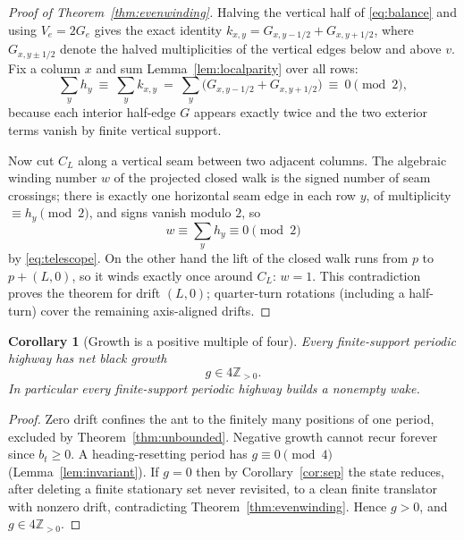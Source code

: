 \documentclass[11pt,letterpaper]{article}
\theoremstyle{plain}
\newtheorem{corollary}[theorem]{Corollary}
\theoremstyle{definition}
\newcommand{\Z}{\mathbb{Z}}
\newcommand{\growth}{g}
\begin{document}
\begin{NoHyper}
\begin{proof}[Proof of Theorem~\ref{thm:evenwinding}]
Halving the vertical half of \eqref{eq:balance} and using $V_e=2G_e$ gives the exact
identity $k_{x,y}=G_{x,y-1/2}+G_{x,y+1/2}$, where $G_{x,y\pm1/2}$ denote the halved
multiplicities of the vertical edges below and above $v$. Fix a column $x$ and sum
Lemma~\ref{lem:localparity} over all rows:
\begin{equation}\label{eq:telescope}
\sum_y h_y\ \equiv\ \sum_y k_{x,y}\ =\ \sum_y\bigl(G_{x,y-1/2}+G_{x,y+1/2}\bigr)\ \equiv\ 0\pmod2,
\end{equation}
because each interior half-edge $G$ appears exactly twice and the two exterior terms
vanish by finite vertical support.

Now cut $C_L$ along a vertical seam between two adjacent columns. The algebraic
winding number $w$ of the projected closed walk is the signed number of seam
crossings; there is exactly one horizontal seam edge in each row $y$, of multiplicity
$\equiv h_y\pmod2$, and signs vanish modulo $2$, so
\[
w\equiv\sum_y h_y\equiv0\pmod2
\]
by \eqref{eq:telescope}. On the other hand the lift of the closed walk runs from $p$
to $p+(L,0)$, so it winds exactly once around $C_L$: $w=1$. This contradiction proves
the theorem for drift $(L,0)$; quarter-turn rotations (including a half-turn) cover the
remaining axis-aligned drifts.
\end{proof}

\begin{corollary}[Growth is a positive multiple of four]\label{cor:growth4}
Every finite-support periodic highway has net black growth
\begin{equation}\label{eq:growth4}
\growth\in4\Z_{>0}.
\end{equation}
In particular every finite-support periodic highway builds a nonempty wake.
\end{corollary}

\begin{proof}
Zero drift confines the ant to the finitely many positions of one period, excluded by
Theorem~\ref{thm:unbounded}. Negative growth cannot recur forever since $b_t\ge0$. A
heading-resetting period has $\growth\equiv0\pmod4$ (Lemma~\ref{lem:invariant}). If
$\growth=0$ then by Corollary~\ref{cor:sep} the state reduces, after deleting a finite
stationary set never revisited, to a clean finite translator with nonzero drift,
contradicting Theorem~\ref{thm:evenwinding}. Hence $\growth>0$, and
$\growth\in4\Z_{>0}$.
\end{proof}


\end{NoHyper}
\end{document}
